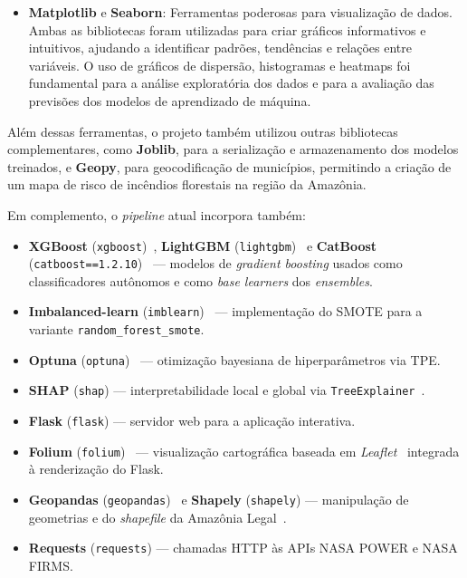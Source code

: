 \begin{itemize}
\begin{itemize}
        \item \textbf{ColumnTransformer}: Facilitou a aplicação simultânea de diferentes transformações para diferentes grupos de atributos, permitindo a separação clara entre as variáveis numéricas e categóricas, o que otimizou o pré-processamento dos dados.
    \end{itemize}

    \item \textbf{Matplotlib} e \textbf{Seaborn}: Ferramentas poderosas para visualização de dados. Ambas as bibliotecas foram utilizadas para criar gráficos informativos e intuitivos, ajudando a identificar padrões, tendências e relações entre variáveis. O uso de gráficos de dispersão, histogramas e heatmaps foi fundamental para a análise exploratória dos dados e para a avaliação das previsões dos modelos de aprendizado de máquina.
\end{itemize}

Além dessas ferramentas, o projeto também utilizou outras bibliotecas complementares, como \textbf{Joblib}, para a serialização e armazenamento dos modelos treinados, e \textbf{Geopy}, para geocodificação de municípios, permitindo a criação de um mapa de risco de incêndios florestais na região da Amazônia.

\medskip
\noindent
Em complemento, o \emph{pipeline} atual incorpora também:

\begin{itemize}
  \item \textbf{XGBoost} (\texttt{xgboost})~\cite{chen2016xgboost}, \textbf{LightGBM} (\texttt{lightgbm})~\cite{ke2017lightgbm} e \textbf{CatBoost} (\texttt{catboost==1.2.10})~\cite{prokhorenkova2018catboost} --- modelos de \emph{gradient boosting} usados como classificadores autônomos e como \emph{base learners} dos \emph{ensembles}.
  \item \textbf{Imbalanced-learn} (\texttt{imblearn})~\cite{lemaitre2017imbalanced} --- implementação do SMOTE para a variante \texttt{random\_forest\_smote}.
  \item \textbf{Optuna} (\texttt{optuna})~\cite{akiba2019optuna} --- otimização bayesiana de hiperparâmetros via TPE.
  \item \textbf{SHAP} (\texttt{shap}) --- interpretabilidade local e global via \texttt{TreeExplainer}~\cite{lundberg2017unified,lundberg2020local}.
  \item \textbf{Flask} (\texttt{flask}) --- servidor web para a aplicação interativa.
  \item \textbf{Folium} (\texttt{folium})~\cite{folium} --- visualização cartográfica baseada em \emph{Leaflet}~\cite{leafletjs} integrada à renderização do Flask.
  \item \textbf{Geopandas} (\texttt{geopandas})~\cite{geopandas} e \textbf{Shapely} (\texttt{shapely}) --- manipulação de geometrias e do \emph{shapefile} da Amazônia Legal~\cite{ibgeamazonia2024}.
  \item \textbf{Requests} (\texttt{requests}) --- chamadas HTTP às APIs NASA POWER e NASA FIRMS.
\end{itemize}

